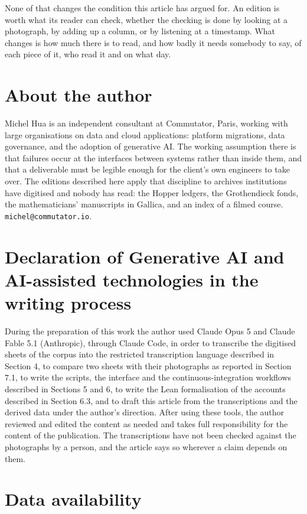 \documentclass[11pt]{article}
\begin{document}
None of that changes the condition this article has argued for. An edition is
worth what its reader can check, whether the checking is done by looking at a
photograph, by adding up a column, or by listening at a timestamp. What changes
is how much there is to read, and how badly it needs somebody to say, of each
piece of it, who read it and on what day.

\section*{About the author}

Michel Hua is an independent consultant at Commutator, Paris, working with
large organisations on data and cloud applications: platform migrations, data
governance, and the adoption of generative AI. The working assumption there is
that failures occur at the interfaces between systems rather than inside them,
and that a deliverable must be legible enough for the client's own engineers to
take over. The editions described here apply that discipline to archives
institutions have digitised and nobody has read: the Hopper ledgers, the
Grothendieck fonds, the mathematicians' manuscripts in Gallica, and an index
of a filmed course. \texttt{michel@commutator.io}.

\section*{Declaration of Generative AI and AI-assisted technologies in the writing process}

During the preparation of this work the author used Claude Opus 5 and Claude Fable 5.1 (Anthropic), through Claude Code, in order to transcribe the digitised sheets of the corpus into the restricted transcription language described in Section 4, to compare two sheets with their photographs as reported in Section 7.1, to write the scripts, the interface and the continuous-integration workflows described in Sections 5 and 6, to write the Lean formalisation of the accounts described in Section 6.3, and to draft this article from the transcriptions and the derived data under the author's direction. After using these tools, the author reviewed and edited the content as needed and takes full responsibility for the content of the publication. The transcriptions have not been checked against the photographs by a person, and the article says so wherever a claim depends on them.

\section*{Data availability}
\end{document}
